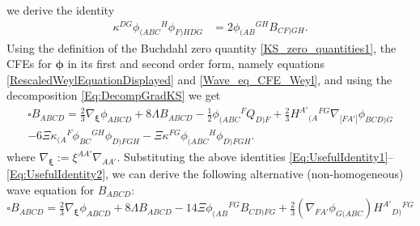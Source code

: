\documentclass[10pt,a4paper]{article}
\theoremstyle{plain}
\newcounter{mnotecount}%
\newcommand{\mnotex}[1]%
{\protect{\stepcounter{mnotecount}}$^{\mbox{\footnotesize $\bullet$\themnotecount}}$ 
\marginpar{%
\raggedright\tiny\em
$\!\!\!\!\!\!\,\bullet$\themnotecount: #1} }
\begin{document}
we derive the identity
\begin{align}
     \kappa^{DG}\phi_{(ABC}{}^H\phi_{F)HDG}&=2\phi_{(AB}{}^{GH}B_{CF)GH}. \label{Eq:UsefulIdentity2}
\end{align}
Using the definition of the Buchdahl zero quantity
\eqref{KS_zero_quantities1}, the CFEs for $\bm\phi$
in its first and second order form, namely equations
\eqref{RescaledWeylEquationDisplayed} and \eqref{Wave_eq_CFE_Weyl},
and using the decomposition \eqref{Eq:DecompGradKS} we get
\begin{multline} 
\square B_{ABCD} = \tfrac{2}{3} \nabla_{\bm\xi}\phi_{ABCD} + 8 \Lambda
B_{ABCD} - \tfrac{1}{2} \phi_{(ABC}{}^{F}Q_{D)F} + \tfrac{2}{3}
H^{A'}{}_{(A}{}^{FG}\nabla_{|FA'|}\phi_{BCD)G} \\ - 6 \Xi
\kappa_{(A}{}^{F}\phi_{BC}{}^{GH}\phi_{D)FGH} - \Xi
\kappa^{FG}\phi_{(ABC}{}^{H}\phi_{D)FGH}.
\end{multline}
where $\nabla_{\bm\xi} := \xi^{AA'}\nabla_{AA'}$. Substituting the above identities
\eqref{Eq:UsefulIdentity1}--\eqref{Eq:UsefulIdentity2}, we can derive
the following alternative (non-homogeneous) wave equation for
$B_{ABCD}$:
\begin{equation}
    \square B_{ABCD} = \tfrac{2}{3}\nabla_{\bm\xi}\phi_{ABCD} +
    8\Lambda B_{ABCD} - 14\Xi \phi_{(AB}{}^{FG}B_{CD)FG} +
    \tfrac{2}{3}(\nabla_{FA'}\phi_{G(ABC})H^{A'}{}_{D)}{}^{FG}\label{Eq:SecondWaveEqForB}
\end{equation}
\end{document}
